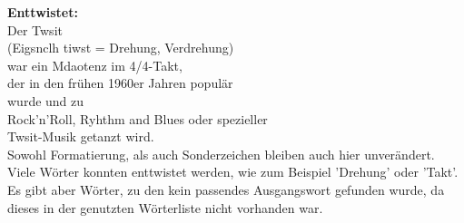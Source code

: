 \documentclass[a4paper,10pt]{scrartcl}
\begin{document}
\begin{description}
\textbf{Enttwistet:}\\
Der Twsit\\
(Eigsnclh tiwst = Drehung, Verdrehung)\\
war ein Mdaotenz im 4/4-Takt,\\
der in den frühen 1960er Jahren populär\\
wurde und zu\\
Rock'n'Roll, Ryhthm and Blues oder spezieller\\
Twsit-Musik getanzt wird.\\

Sowohl Formatierung, als auch Sonderzeichen bleiben auch hier unverändert. Viele Wörter konnten enttwistet werden, wie zum Beispiel 'Drehung' oder 'Takt'. Es gibt aber Wörter, zu den kein passendes Ausgangswort gefunden wurde, da dieses in der genutzten Wörterliste nicht vorhanden war.
\end{description}
\end{document}
